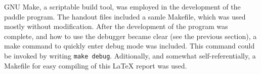 GNU Make, a scriptable build tool, was employed in the development of the paddle program.
The handout files included a samle Makefile, which was used mostly without modification.
After the development of the program was complete, and how to use the debugger became clear (see the previous section), a make command to quickly enter debug mode was included.
This command could be invoked by writing \texttt{make debug}.
Aditionally, and somewhat self-referentially, a Makefile for easy compiling of this LaTeX report was used.
